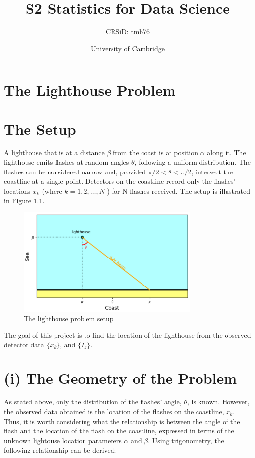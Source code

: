\documentclass[12pt]{report} %
\title{S2 Statistics for Data Science}
\author{CRSiD: tmb76}
\date{University of Cambridge}
\begin{document}
\maketitle

\tableofcontents

\chapter*{The Lighthouse Problem}

\chapter{The Setup}

\indent A lighthouse that is at a distance $\beta$ from the coast is at position $\alpha$ along it. The lighthouse emits flashes at random angles $\theta$, following a uniform distribution. The flashes can be considered narrow and, provided $\pi/2 < \theta < \pi/2$, intersect the coastline at a single point. Detectors on the coastline record only the flashes' locations $x_{k}$ (where $k = 1, 2,\dots, N$ ) for N flashes received. The setup is illustrated in Figure \ref{fig:lighthouse}.

\begin{figure}[h]
\centering
\includegraphics[width=0.8\textwidth]{../Plots/lighthouse diagram.png}
\caption{The lighthouse problem setup}
\label{fig:lighthouse}
\end{figure}


The goal of this project is to find the location of the lighthouse from the observed detector data $\{x_{k}\}$, and $\{I_{k}\}$.

\chapter{(i) The Geometry of the Problem}

As stated above, only the distribution of the flashes' angle, $\theta$, is known. However, the observed data obtained is the location of the flashes on the coastline, $x_{k}$. Thus, it is worth considering what the relationship is between the angle of the flash and the location of the flash on the coastline, expressed in terms of the unknown lightouse location parameters $\alpha$ and $\beta$. Using trigonometry, the following relationship can be derived:
\end{document}
